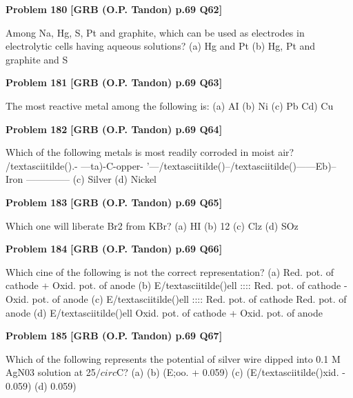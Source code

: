 \begin{problembox}
\textbf{Problem 180} \hfill \textbf{[GRB (O.P. Tandon) p.69 Q62]}
\label{q:ext-grb_all_questions-180}

Among Na, Hg, S, Pt and graphite, which can be used as 
electrodes in electrolytic cells having aqueous solutions? 
(a) Hg and Pt 
(b) Hg, Pt and graphite 
and S
\end{problembox}

\begin{problembox}
\textbf{Problem 181} \hfill \textbf{[GRB (O.P. Tandon) p.69 Q63]}
\label{q:ext-grb_all_questions-181}

The most reactive metal among the following is: 
(a) AI 
(b) Ni 
(c) Pb 
Cd) Cu
\end{problembox}

\begin{problembox}
\textbf{Problem 182} \hfill \textbf{[GRB (O.P. Tandon) p.69 Q64]}
\label{q:ext-grb_all_questions-182}

Which of the following metals is most readily corroded in 
moist air? 
/textasciitilde()\underline{\hspace{1cm}}.- ---ta)-C-opper- '---/textasciitilde()--/textasciitilde()------Eb)--Iron --------------
(c) Silver 
(d) Nickel
\end{problembox}

\begin{problembox}
\textbf{Problem 183} \hfill \textbf{[GRB (O.P. Tandon) p.69 Q65]}
\label{q:ext-grb_all_questions-183}

Which one will liberate Br2 from KBr? 
(a) HI 
(b) 12 
(c) Clz 
(d) SOz
\end{problembox}

\begin{problembox}
\textbf{Problem 184} \hfill \textbf{[GRB (O.P. Tandon) p.69 Q66]}
\label{q:ext-grb_all_questions-184}

Which cine of the following is not the correct representation? 
(a) 
Red. pot. of cathode + Oxid. pot. of anode 
(b) E/textasciitilde()ell :::: Red. pot. of cathode - Oxid. pot. of anode 
(c) E/textasciitilde()ell :::: Red. pot. of cathode 
Red. pot. of anode 
(d) E/textasciitilde()ell 
Oxid. pot. of cathode + Oxid. pot. of anode
\end{problembox}

\begin{problembox}
\textbf{Problem 185} \hfill \textbf{[GRB (O.P. Tandon) p.69 Q67]}
\label{q:ext-grb_all_questions-185}

Which of the following represents the potential of silver wire 
dipped into 0.1 M AgN03 solution at 25$/circ$C? 
(a) 
(b) (E;oo. + 0.059) 
(c) (E/textasciitilde()xid. - 0.059) 
(d) 
0.059)
\end{problembox}

